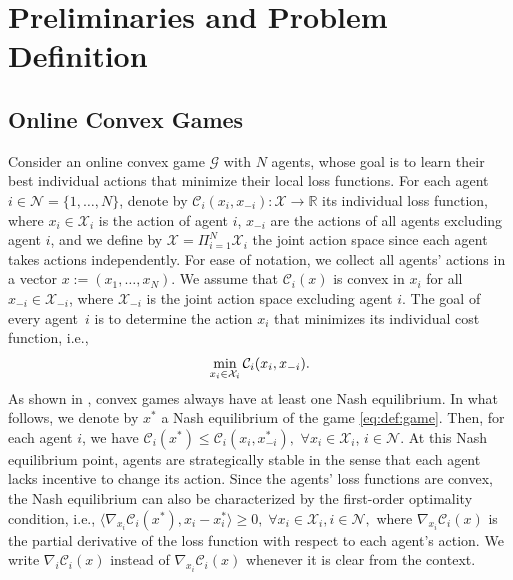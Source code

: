 \section{Preliminaries and Problem Definition}\label{sec:problem}
\subsection{Online Convex Games}
Consider an online convex game $\mathcal{G}$ with $N$ agents, whose goal is to learn their best individual actions that minimize their local loss functions.
%
For each agent  $i\in \mathcal{N}=\{1,\ldots,N\}$, denote by $\mathcal{C}_i(x_i,x_{-i}) : \mathcal{X} \rightarrow \mathbb{R}$ its individual loss function, where $x_i \in \mathcal{X}_i$ is the action of agent $i$, $x_{-i}$ are the actions of all agents excluding agent $i$, and we define by $\mathcal{X} =\Pi_{i=1}^N\mathcal{X}_i$ the joint action space since each agent takes actions independently. 
%
For ease of notation, we collect all agents' actions in a vector $x:=(x_1,\ldots,x_N)$. 
%
We assume that $\mathcal{C}_i(x)$ is convex in $x_i$ for all $x_{-i} \in \mathcal{X}_{-i}$, where $\mathcal{X}_{-i}$ is the joint action space excluding agent $i$.
%
The goal of every agent~$i$ is to determine the action $x_i$ that minimizes its individual cost function, i.e., 
\begin{align}\label{eq:def:game}
    \mathop{{\rm{min}}}_{x_i \in \mathcal{X}_i} \mathcal{C}_{i}(x_i,x_{-i}).
\end{align}
As shown in \cite{rosen1965existence}, convex games always have at least one Nash equilibrium. In what follows, we denote by $x^{*}$ a Nash equilibrium of the game \eqref{eq:def:game}. Then, for each agent $i$, we have $\mathcal{C}_i(x^{*})\leq \mathcal{C}_i(x_i,x_{-i}^{*}),$ $\forall x_i \in \mathcal{X}_i$, $i\in\mathcal{N}$. At this Nash equilibrium point, agents are strategically stable in the sense that each agent lacks incentive to change its action.
%
Since the agents' loss functions are convex, the Nash equilibrium can also be characterized by the first-order optimality condition, i.e., $\langle \nabla_{x_i} \mathcal{C}_i(x^{*}), x_i - x_i^{*} \rangle \geq 0, \; \forall x_i \in \mathcal{X}_i, i\in\mathcal{N},$ where $\nabla_{x_i} \mathcal{C}_i(x)$ is the partial derivative of the loss function with respect to each agent's action.  We write $\nabla_{i} \mathcal{C}_i(x)$ instead of $\nabla_{x_i} \mathcal{C}_i(x)$ whenever it is clear from the context. 

